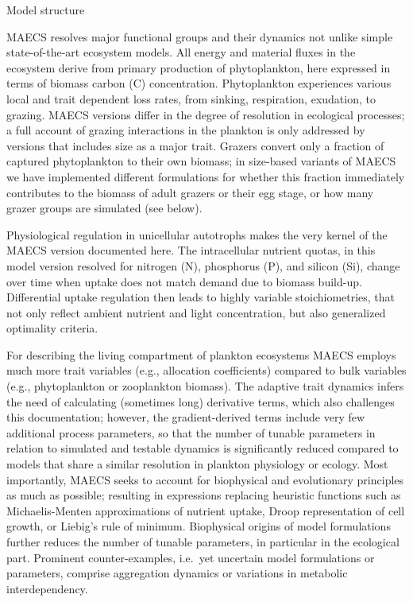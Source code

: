 \begin{section}{Model structure}\label{sec:ModStr}

MAECS resolves major functional groups and their dynamics not unlike simple state-of-the-art ecosystem models. All energy and material fluxes in the ecosystem derive from primary production of phytoplankton, here expressed in terms of biomass carbon (C) concentration. Phytoplankton experiences various local and trait dependent loss rates, from sinking, respiration, exudation, to grazing. 
MAECS versions differ in the degree of resolution in ecological processes; a full account of grazing interactions in the plankton is only addressed by versions that includes size as a major trait. Grazers convert only a fraction of captured phytoplankton to their own biomass; in size-based variants of MAECS we have implemented different formulations for whether this fraction immediately contributes to the biomass of adult grazers or their egg stage, or how many grazer groups are simulated (see below).

Physiological regulation in unicellular autotrophs makes the very kernel of the MAECS version documented here. 
The intracellular nutrient quotas, in this model version resolved for nitrogen (N), phosphorus (P), and silicon (Si), change over time when uptake does not match demand due to biomass build-up. Differential uptake regulation then leads to highly variable stoichiometries, that not only reflect ambient nutrient and light concentration, but also generalized optimality criteria.

For describing the living compartment of plankton ecosystems MAECS employs much more trait variables (e.g., allocation coefficients) compared to bulk variables (e.g., phytoplankton or zooplankton biomass). The adaptive trait dynamics infers the need of calculating (sometimes long) derivative terms, which also challenges this documentation; however, the gradient-derived terms include very few  additional process parameters, so that the number of tunable parameters in relation to simulated and testable dynamics is significantly reduced compared to models that share a similar resolution in plankton physiology or ecology. Most importantly, MAECS seeks to account for biophysical and evolutionary principles as much as possible; resulting in expressions replacing heuristic functions such as Michaelis-Menten approximations of nutrient uptake, Droop representation of cell growth, or Liebig's rule of minimum. Biophysical origins of model formulations further reduces the number of tunable parameters, in particular in the ecological part. Prominent counter-examples, i.e.~yet uncertain model formulations or parameters, comprise aggregation dynamics or variations in metabolic interdependency. 



\end{section}
